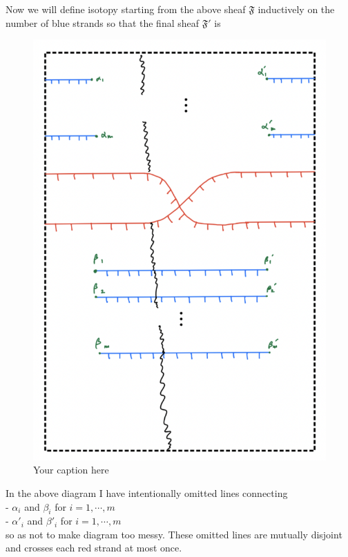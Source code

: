 Now we will define isotopy starting from the above sheaf $\mathfrak{F}$ inductively on the number of blue strands so that the final sheaf $\mathfrak{F}'$ is
\begin{figure}[H] %
    \centering
    \includegraphics[scale=0.95]{diagrams/lemma11/2.png} %
    \caption{Your caption here}
    \label{fig:your-label}
\end{figure}
In the above diagram I have intentionally omitted lines connecting \\
- $\alpha_i$ and $\beta_i$ for $i=1,\cdots ,m$\\
- $\alpha'_i$ and $\beta'_i$ for $i=1,\cdots ,m$\\

so as not to make diagram too messy. These omitted lines are mutually disjoint and crosses each red strand at most once. \\

